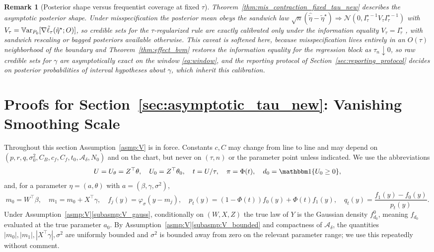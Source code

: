 \documentclass[11pt]{article}
\theoremstyle{definition}
\theoremstyle{plain}
\newtheorem{remark}{Remark}
\newcommand{\Var}{\mathbb{V}{\rm ar}}
\begin{document}
\begin{remark}[Posterior shape versus frequentist coverage at fixed $\tau$]
\label{rem:sandwich_note}
Theorem~\ref{thm:mis_contraction_fixed_tau_new} describes the asymptotic posterior shape. Under misspecification the posterior mean obeys the sandwich law $\sqrt n(\hat{\tilde\eta}-\tilde\eta^\star)\Rightarrow\mathcal N(0,I_\tau^{\star-1}V_\tau I_\tau^{\star-1})$ with $V_\tau=\Var_{P_0}[\nabla\tilde\ell_\tau(\tilde\eta^\star;O)]$, so credible sets for the $\tau$-regularized rule are exactly calibrated only under the information equality $V_\tau=I_\tau^\star$ \citep{White1982,Kleijn2012,Mueller2013}, with sandwich rescaling or bagged posteriors \citep{Huggins2021,Syring2019} available otherwise. This caveat is softened here, because misspecification lives entirely in an $O(\tau)$ neighborhood of the boundary and Theorem~\ref{thm:effect_bvm} restores the information equality for the regression block as $\tau_n\downarrow0$, so raw credible sets for $\gamma$ are asymptotically exact on the window \eqref{eq:window}, and the reporting protocol of Section~\ref{sec:reporting_protocol} decides on posterior probabilities of interval hypotheses about $\gamma$, which inherit this calibration.
\end{remark}
\section{Proofs for Section~\ref{sec:asymptotic_tau_new}: Vanishing Smoothing Scale}
\label{sec:proofs_tau_n_new}

Throughout this section Assumption~\ref{asmp:V} is in force. Constants $c,C$ may change from line to line and may depend on $(p,r,q,\sigma_0^2,C_B,c_f,C_f,t_0,\mathcal A_\delta,N_0)$ and on the chart, but never on $(\tau,n)$ or the parameter point unless indicated. We use the abbreviations
\[
U=U_\theta=Z^\top\theta,\quad U_0=Z^\top\theta_0,\quad t=U/\tau,\quad
\pi=\Phi(t),\quad d_0=\mathbbm 1\{U_0\ge0\},
\]
and, for a parameter $\eta=(a,\theta)$ with $a=(\beta,\gamma,\sigma^2)$,
\[
m_0=W^\top\beta,\quad m_1=m_0+X^\top\gamma,\quad
f_j(y)=\varphi_\sigma(y-m_j),\quad
p_t(y)=(1-\Phi(t))f_0(y)+\Phi(t)f_1(y),\quad
q_t(y)=\frac{f_1(y)-f_0(y)}{p_t(y)} .
\]
Under Assumption~\ref{asmp:V}\ref{subasmp:V_gauss}, conditionally on $(W,X,Z)$ the true law of $Y$ is the Gaussian density $f_{d_0}^0$, meaning $f_{d_0}$ evaluated at the true parameter $a_0$. By Assumption~\ref{asmp:V}\ref{subasmp:V_bounded} and compactness of $\mathcal A_\delta$, the quantities $|m_0|,|m_1|,|X^\top\gamma|,\sigma^2$ are uniformly bounded and $\sigma^2$ is bounded away from zero on the relevant parameter range; we use this repeatedly without comment.
\end{document}
